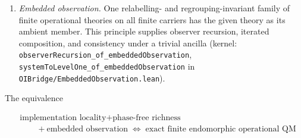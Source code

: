 \documentclass[
]{article}
\begin{document}
\begin{enumerate}
  \texttt{OIBridge/MinimalRepertoire.lean}) --- and thereby yield the
  Lie-rank condition and hence exact finite unitary reachability at that
  level (kernel: \texttt{control\_at\_level}, through
  \texttt{control\_of\_lieRank}). On a two-state carrier the drive and
  the exchange commute and the generated algebra reaches no population
  difference (kernel: \texttt{not\_hControl\_two}); the levels with two
  or fewer states inherit control instead from the level with three
  times as many states, through the ancilla attachment and discard that
  embedded observation supplies (kernel: \texttt{descend},
  \texttt{control\_of\_phaseFree}). The exchanges themselves are
  generated by one full cycle and one adjacent exchange (kernel:
  \texttt{phaseFree\_of\_cyclic}). Elementary transition richness ---
  every pair of distinguishable states continuously drivable, every
  exchange available, and a quarter phase on every state, the quarter
  phase supplying the imaginary partner of a transition directly --- is
  a stronger form of the same principle (kernel:
  \texttt{phaseFree\_of\_elementary}; \texttt{lieRank\_of\_elementary},
  \texttt{hControl\_star}, \texttt{bracket\_XY}), and the two forms
  characterize the same theory (kernel:
  \texttt{oiPlusMin\_iff\_oiPlusPos}).
\item
  \emph{Embedded observation.} One relabelling- and regrouping-invariant
  family of finite operational theories on all finite carriers has the
  given theory as its ambient member. This principle supplies observer
  recursion, iterated composition, and consistency under a trivial
  ancilla (kernel: \texttt{observerRecursion\_of\_embeddedObservation},
  \texttt{systemToLevelOne\_of\_embeddedObservation} in
  \texttt{OIBridge/EmbeddedObservation.lean}).
\end{enumerate}

The equivalence

\[\boxed{\begin{aligned}&\text{implementation locality} + \text{phase-free richness}\\ &\qquad + \text{embedded observation} \;\iff\; \text{exact finite endomorphic operational QM}\end{aligned}}\]
\end{document}
